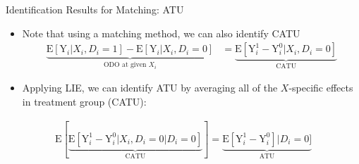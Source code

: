 \documentclass[hyperref={pdfpagelabels=false}]{beamer}
\begin{document}
\begin{frame}{Identification Results for Matching: ATU}
	\begin{itemize}
		
		\item Note that using a matching method, we can also identify CATU
		\vspace{0.2cm}
		\begin{equation*}
			\begin{aligned}
	\underbrace{\mathrm{E}[\mathrm{Y}_{i}|X_{i},D_{i}=1] - \mathrm{E}[\mathrm{Y}_{i}|X_{i},D_{i}=0]}_{\text{ODO at given $X_{i}$}}  &= \underbrace{\mathrm{E}[\mathrm{Y}^{1}_{i}-\mathrm{Y}^{0}_{i}|X_{i},D_i=0]}_{\text{CATU}}
			\end{aligned}
		\end{equation*}	
		
		
		\item Applying LIE, we can identify ATU by averaging all of the $X$-specific effects in treatment group (CATU):
		\vspace{0.2cm}
		
	\end{itemize}
	\begin{equation*}
		\begin{aligned}
			\mathrm{E}[\underbrace{\mathrm{E}[\mathrm{Y}^{1}_{i}-\mathrm{Y}^{0}_{i}|X_{i},D_i=0 |D_i=0]}_{\text{CATU}}] 
			=\underbrace{\mathrm{E}[\mathrm{Y}^{1}_{i}-\mathrm{Y}^{0}_{i}]|D_i=0]}_{\text{ATU}}
			
		\end{aligned}
	\end{equation*}	
	
\end{frame}
\end{document}

